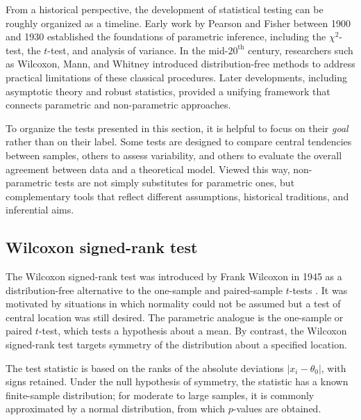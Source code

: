 \medskip

From a historical perspective, the development of statistical testing can be roughly organized as a timeline. Early work by Pearson and Fisher between 1900 and 1930 established the foundations of parametric inference, including the \(\chi^2\)-test, the \(t\)-test, and analysis of variance. In the mid-$20^{\text{th}}$ century, researchers such as Wilcoxon, Mann, and Whitney introduced distribution-free methods to address practical limitations of these classical procedures. Later developments, including asymptotic theory and robust statistics, provided a unifying framework that connects parametric and non-parametric approaches.

\medskip

To organize the tests presented in this section, it is helpful to focus on their \emph{goal} rather than on their label. Some tests are designed to compare central tendencies between samples, others to assess variability, and others to evaluate the overall agreement between data and a theoretical model. Viewed this way, non-parametric tests are not simply substitutes for parametric ones, but complementary tools that reflect different assumptions, historical traditions, and inferential aims.

\subsection{Wilcoxon signed-rank test}

The Wilcoxon signed-rank test was introduced by Frank Wilcoxon in 1945 as a distribution-free alternative to the one-sample and paired-sample \(t\)-tests \cite{wilcoxon_1945_ranks}. It was motivated by situations in which normality could not be assumed but a test of central location was still desired. The parametric analogue is the one-sample or paired \(t\)-test, which tests a hypothesis about a mean. By contrast, the Wilcoxon signed-rank test targets symmetry of the distribution about a specified location.

\medskip

The test statistic is based on the ranks of the absolute deviations \(|x_i - \theta_0|\), with signs retained. Under the null hypothesis of symmetry, the statistic has a known finite-sample distribution; for moderate to large samples, it is commonly approximated by a normal distribution, from which \(p\)-values are obtained.

